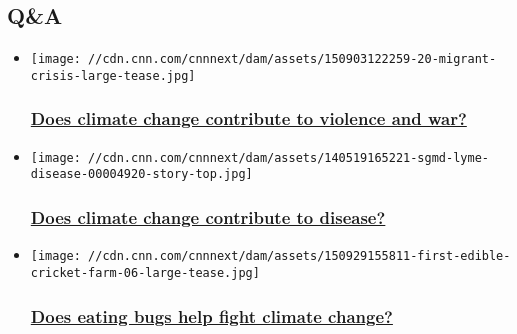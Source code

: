 \hypertarget{qa-}{%
\subsection{Q\&A~}\label{qa-}}

\begin{itemize}
\item
  \href{/2015/11/13/world/two-degrees-question-climate-change-and-conflict/index.html}{}

  \texttt{[image: //cdn.cnn.com/cnnnext/dam/assets/150903122259-20-migrant-crisis-large-tease.jpg]}

  \hypertarget{does-climate-change-contribute-to-violence-and-war-}{%
  \subsubsection{\texorpdfstring{\href{/2015/11/13/world/two-degrees-question-climate-change-and-conflict/index.html}{Does
  climate change contribute to violence and war?
  }}{Does climate change contribute to violence and war? }}\label{does-climate-change-contribute-to-violence-and-war-}}
\end{itemize}

\begin{itemize}
\item
  \href{/2015/11/20/world/two-degrees-question-climate-change-and-disease/index.html}{}

  \texttt{[image: //cdn.cnn.com/cnnnext/dam/assets/140519165221-sgmd-lyme-disease-00004920-story-top.jpg]}

  \hypertarget{does-climate-change-contribute-to-disease}{%
  \subsubsection{\texorpdfstring{\href{/2015/11/20/world/two-degrees-question-climate-change-and-disease/index.html}{Does
  climate change contribute to
  disease?}}{Does climate change contribute to disease?}}\label{does-climate-change-contribute-to-disease}}
\end{itemize}

\begin{itemize}
\item
  \href{/2015/10/02/world/sutter-bugs-climate-two-degrees-question/index.html}{}

  \texttt{[image: //cdn.cnn.com/cnnnext/dam/assets/150929155811-first-edible-cricket-farm-06-large-tease.jpg]}

  \hypertarget{does-eating-bugs-help-fight-climate-change-}{%
  \subsubsection{\texorpdfstring{\href{/2015/10/02/world/sutter-bugs-climate-two-degrees-question/index.html}{Does
  eating bugs help fight climate change?
  }}{Does eating bugs help fight climate change? }}\label{does-eating-bugs-help-fight-climate-change-}}
\end{itemize}

